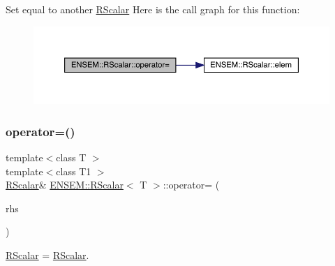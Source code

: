 Set equal to another \mbox{\hyperlink{classENSEM_1_1RScalar}{R\+Scalar}} Here is the call graph for this function\+:
\nopagebreak
\begin{figure}[H]
\begin{center}
\leavevmode
\includegraphics[width=350pt]{d0/d8c/classENSEM_1_1RScalar_a81b105339878a490866e9467135ae4fa_cgraph}
\end{center}
\end{figure}
\mbox{\label{classENSEM_1_1RScalar_a81b105339878a490866e9467135ae4fa}} 
\subsubsection{\texorpdfstring{operator=()}{operator=()}\hspace{0.1cm}{\footnotesize\ttfamily [2/3]}}
{\footnotesize\ttfamily template$<$class T $>$ \\
template$<$class T1 $>$ \\
\mbox{\hyperlink{classENSEM_1_1RScalar}{R\+Scalar}}\& \mbox{\hyperlink{classENSEM_1_1RScalar}{E\+N\+S\+E\+M\+::\+R\+Scalar}}$<$ T $>$\+::operator= (\begin{DoxyParamCaption}\item[{const \mbox{\hyperlink{classENSEM_1_1RScalar}{R\+Scalar}}$<$ T1 $>$ \&}]{rhs }\end{DoxyParamCaption})\hspace{0.3cm}{\ttfamily [inline]}}



\mbox{\hyperlink{classENSEM_1_1RScalar}{R\+Scalar}} = \mbox{\hyperlink{classENSEM_1_1RScalar}{R\+Scalar}}. 


